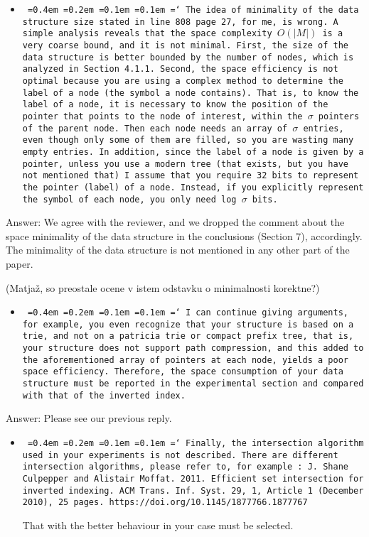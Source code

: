 \documentclass[11pt,a4paper]{article}
\newcommand*\justify{%
  \fontdimen2\font=0.4em%
  \fontdimen3\font=0.2em%
  \fontdimen4\font=0.1em%
  \fontdimen7\font=0.1em%
  \hyphenchar\font=`\-%
}
\newcommand{\comment}[1]{\begin{itemize}
    \item {\tt\justify #1}
\end{itemize}}
\newcommand{\answer}[1]{{\sc Answer:} #1}
\begin{document}
\comment{The idea of minimality of the data structure size stated in line 808 page 27, for me, is wrong. 
A simple analysis reveals that the space complexity $O(|M|)$ is a very coarse bound, and it is not minimal. 
First, the size of the data structure is better bounded by the number of nodes, which is analyzed in Section 4.1.1. Second, the space efficiency is not optimal because you are using a complex method to determine the label of a node (the symbol a node contains). That is, to know the label of a node, it is necessary to know the position of the pointer that points to the node of interest, within the $\sigma$ pointers of the parent node. Then each node needs an array of $\sigma$ entries, even though only some of them are filled, so you are wasting many empty entries. In addition, since the label of a node is given by a pointer, unless you use a modern tree (that exists, but you have not mentioned that) I assume that you require 32 bits to represent the pointer (label) of a node. Instead, if you explicitly represent the symbol of each node, you only need log $\sigma$ bits.
}

\answer{We agree with the reviewer, and we dropped the comment about the space minimality of the data
structure in the conclusions (Section 7), accordingly.
The minimality of the data structure is not mentioned in any other part of the paper.
}
(Matjaž, so preostale ocene v istem odstavku o minimalnosti korektne?)

\comment{I can continue giving arguments, for example, you even recognize that your structure is based on a trie, and not on a patricia trie or compact prefix tree, that is, your structure does not support path compression, and this added to the aforementioned array of pointers at each node, yields a poor space efficiency.
Therefore, the space consumption of your data structure must be reported in the experimental section and compared with that of the inverted index.
}

\answer{Please see our previous reply.}

\comment{Finally, the intersection algorithm used in your experiments is not described. There are different intersection algorithms, please refer to, for example :
J. Shane Culpepper and Alistair Moffat. 2011. Efficient set intersection for inverted indexing. ACM Trans. Inf. Syst. 29, 1, Article 1 (December 2010), 25 pages. https://doi.org/10.1145/1877766.1877767

That with the better behaviour in your case must be selected.
}
\end{document}
